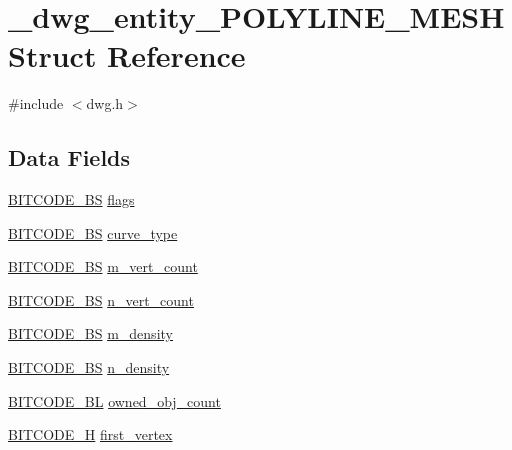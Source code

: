 \hypertarget{struct__dwg__entity__POLYLINE__MESH}{\section{\-\_\-dwg\-\_\-entity\-\_\-\-P\-O\-L\-Y\-L\-I\-N\-E\-\_\-\-M\-E\-S\-H \-Struct \-Reference}
\label{struct__dwg__entity__POLYLINE__MESH}
}


{\ttfamily \#include $<$dwg.\-h$>$}

\subsection*{\-Data \-Fields}
\begin{DoxyCompactItemize}
\item 
\hyperlink{dwg_8h_a94297606fbd4a4ff97e8add284af0809}{\-B\-I\-T\-C\-O\-D\-E\-\_\-\-B\-S} \hyperlink{struct__dwg__entity__POLYLINE__MESH_adef226c817f6a5452b18581ae2bfd533}{flags}
\item 
\hyperlink{dwg_8h_a94297606fbd4a4ff97e8add284af0809}{\-B\-I\-T\-C\-O\-D\-E\-\_\-\-B\-S} \hyperlink{struct__dwg__entity__POLYLINE__MESH_a0da6b8e2a896fefc919c0335a545f898}{curve\-\_\-type}
\item 
\hyperlink{dwg_8h_a94297606fbd4a4ff97e8add284af0809}{\-B\-I\-T\-C\-O\-D\-E\-\_\-\-B\-S} \hyperlink{struct__dwg__entity__POLYLINE__MESH_a58c4d751c19ec11c408587d81ab5cb89}{m\-\_\-vert\-\_\-count}
\item 
\hyperlink{dwg_8h_a94297606fbd4a4ff97e8add284af0809}{\-B\-I\-T\-C\-O\-D\-E\-\_\-\-B\-S} \hyperlink{struct__dwg__entity__POLYLINE__MESH_a514bbac3840d608a1e63afbe574782e6}{n\-\_\-vert\-\_\-count}
\item 
\hyperlink{dwg_8h_a94297606fbd4a4ff97e8add284af0809}{\-B\-I\-T\-C\-O\-D\-E\-\_\-\-B\-S} \hyperlink{struct__dwg__entity__POLYLINE__MESH_a4541de2c85c1a55e5ef8f322c9bf6ecd}{m\-\_\-density}
\item 
\hyperlink{dwg_8h_a94297606fbd4a4ff97e8add284af0809}{\-B\-I\-T\-C\-O\-D\-E\-\_\-\-B\-S} \hyperlink{struct__dwg__entity__POLYLINE__MESH_a2f8d21779f2d324233432a26b7d13e4d}{n\-\_\-density}
\item 
\hyperlink{dwg_8h_aebd5f127038868cbabc3d55d91da776c}{\-B\-I\-T\-C\-O\-D\-E\-\_\-\-B\-L} \hyperlink{struct__dwg__entity__POLYLINE__MESH_a8a433b13cef33e5fd198851063b1f75f}{owned\-\_\-obj\-\_\-count}
\item 
\hyperlink{dwg_8h_a7c700e94e047a97ba8c24bdfe4029dc3}{\-B\-I\-T\-C\-O\-D\-E\-\_\-\-H} \hyperlink{struct__dwg__entity__POLYLINE__MESH_a77a580001dc6e120cec319e8aac5f453}{first\-\_\-vertex}

\end{DoxyCompactItemize}
